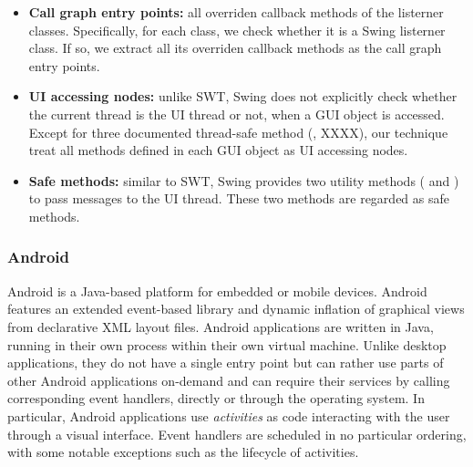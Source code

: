 \begin{itemize}

\item \textbf{Call graph entry points: } all overriden callback methods of the listerner classes.
Specifically, for each class, we check whether it is a Swing listerner class. If so,
we extract all its overriden callback methods as the call graph entry points.

\item \textbf{UI accessing nodes:} unlike SWT, Swing does not explicitly check
whether the current thread is the UI thread or not, when a GUI object is accessed. Except
for three documented thread-safe method (, XXXX), our technique
treat all methods defined in each GUI object as UI accessing nodes.

\item \textbf{Safe methods: } similar to SWT, Swing provides two utility methods
( and ) to pass messages to the UI thread. These two methods are regarded as safe methods.

\end{itemize}


\subsubsection{Android}

Android is a Java-based platform for embedded or mobile devices. 
Android features an extended event-based library and dynamic inflation of
graphical views from declarative XML layout files. Android applications are
written in Java, running in their own process within their own virtual machine.
Unlike desktop applications, they do not have a single entry point but can
rather use parts of other Android applications on-demand and can require their
services by calling corresponding event handlers, directly or through the
operating system. In particular, Android applications use \textit{activities}
as code interacting with the user through a visual interface. Event handlers
are scheduled in no particular ordering, with some notable exceptions such as the
lifecycle of activities.

